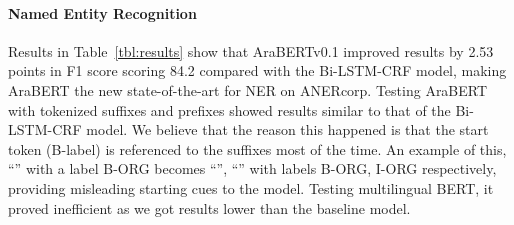 \documentclass[10pt, a4paper]{article}
\begin{document}
\begin{table}[!ht]
\begin{center}
\centering
\caption{Performance of AraBERT on Arabic downstream tasks compared to mBERT and previous state of the art systems\label{tbl:results}}

\end{center}
\end{table}

\paragraph{Named Entity Recognition}
Results in Table~\ref{tbl:results} show that AraBERTv0.1 improved results by 2.53 points in F1 score scoring 84.2 compared with the Bi-LSTM-CRF model, making AraBERT the new state-of-the-art for NER on ANERcorp. Testing AraBERT with tokenized suffixes and prefixes showed results similar to that of the Bi-LSTM-CRF model. We believe that the reason this happened is that the start token (B-label) is referenced to the suffixes most of the time. An example of this, ``'' with a label B-ORG becomes ``'', ``'' with labels B-ORG, I-ORG respectively, providing misleading starting cues to the model. Testing multilingual BERT, it proved inefficient as we got results lower than the baseline model.
\end{document}
